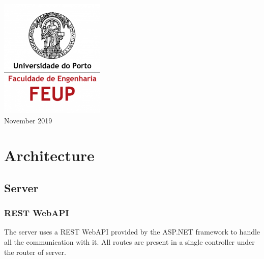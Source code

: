\documentclass[12pt]{article}
\begin{document}
\begin{titlepage}
\includegraphics[width=50mm,scale=0.5]{feuplogo.png}\\[0.5cm] %





{\large November 2019}\\[2cm] %


\vfill %

\end{titlepage}
\tableofcontents
\pagebreak

\section{Architecture}

\subsection{Server}

\subsubsection{REST WebAPI}
The server uses a REST WebAPI provided by the ASP.NET framework to handle all the communication with it. All routes are present in a single controller under the router of server. 
\end{document}
